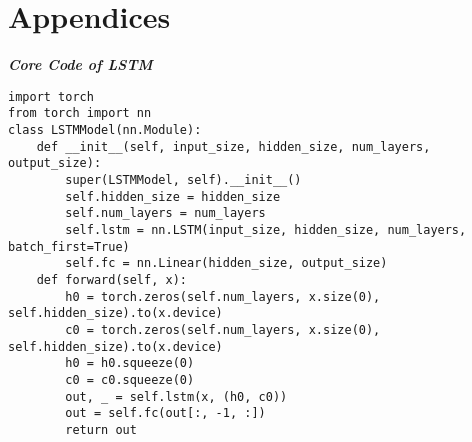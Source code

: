 \newpage
\section*{Appendices}

\textbf{\textit{\large{Core Code of LSTM}}}
\begin{lstlisting}
import torch
from torch import nn
class LSTMModel(nn.Module):
    def __init__(self, input_size, hidden_size, num_layers, output_size):
        super(LSTMModel, self).__init__()
        self.hidden_size = hidden_size
        self.num_layers = num_layers
        self.lstm = nn.LSTM(input_size, hidden_size, num_layers, batch_first=True)
        self.fc = nn.Linear(hidden_size, output_size)
    def forward(self, x):
        h0 = torch.zeros(self.num_layers, x.size(0), self.hidden_size).to(x.device)
        c0 = torch.zeros(self.num_layers, x.size(0), self.hidden_size).to(x.device)
        h0 = h0.squeeze(0)
        c0 = c0.squeeze(0)
        out, _ = self.lstm(x, (h0, c0))
        out = self.fc(out[:, -1, :])
        return out

\end{lstlisting}



